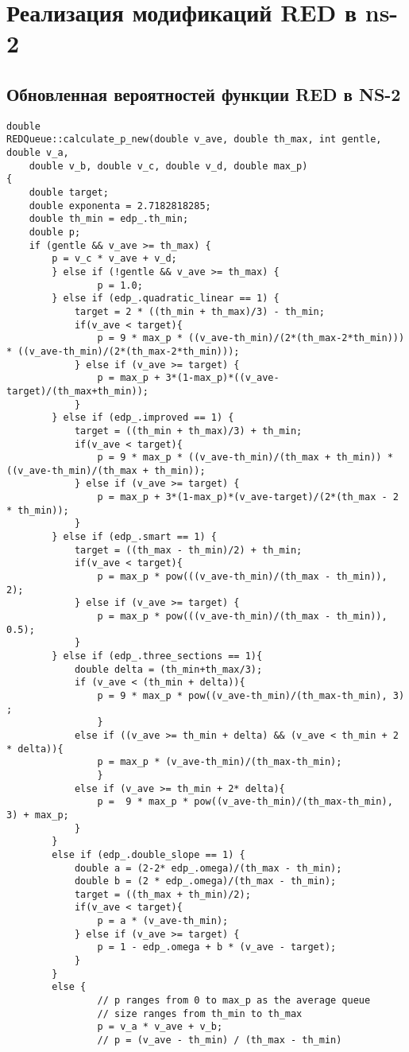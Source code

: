
\chapter{Реализация модификаций RED в ns-2}
\label{app2}

\section{Обновленная вероятностей функции RED в NS-2}
\label{app2:sec1}
\begin{verbatim}
double
REDQueue::calculate_p_new(double v_ave, double th_max, int gentle, double v_a, 
	double v_b, double v_c, double v_d, double max_p)
{	
	double target;
	double exponenta = 2.7182818285;
	double th_min = edp_.th_min;
	double p;
	if (gentle && v_ave >= th_max) {
		p = v_c * v_ave + v_d;
        } else if (!gentle && v_ave >= th_max) { 
                p = 1.0;
        } else if (edp_.quadratic_linear == 1) {
        	target = 2 * ((th_min + th_max)/3) - th_min;
        	if(v_ave < target){
        		p = 9 * max_p * ((v_ave-th_min)/(2*(th_max-2*th_min))) * ((v_ave-th_min)/(2*(th_max-2*th_min)));
        	} else if (v_ave >= target) {
        		p = max_p + 3*(1-max_p)*((v_ave-target)/(th_max+th_min));
        	}
        } else if (edp_.improved == 1) {
        	target = ((th_min + th_max)/3) + th_min;
        	if(v_ave < target){
        		p = 9 * max_p * ((v_ave-th_min)/(th_max + th_min)) * ((v_ave-th_min)/(th_max + th_min));
        	} else if (v_ave >= target) {
        		p = max_p + 3*(1-max_p)*(v_ave-target)/(2*(th_max - 2 * th_min));
        	}
        } else if (edp_.smart == 1) {
        	target = ((th_max - th_min)/2) + th_min;
        	if(v_ave < target){
        		p = max_p * pow(((v_ave-th_min)/(th_max - th_min)), 2);
        	} else if (v_ave >= target) {
        		p = max_p * pow(((v_ave-th_min)/(th_max - th_min)), 0.5);
        	}
        } else if (edp_.three_sections == 1){
        	double delta = (th_min+th_max/3);
        	if (v_ave < (th_min + delta)){
        		p = 9 * max_p * pow((v_ave-th_min)/(th_max-th_min), 3) ;
        		}
        	else if ((v_ave >= th_min + delta) && (v_ave < th_min + 2 * delta)){
        		p = max_p * (v_ave-th_min)/(th_max-th_min);
        		}
        	else if (v_ave >= th_min + 2* delta){
        		p =  9 * max_p * pow((v_ave-th_min)/(th_max-th_min), 3) + max_p;
        	} 
        }
        else if (edp_.double_slope == 1) {
        	double a = (2-2* edp_.omega)/(th_max - th_min);
        	double b = (2 * edp_.omega)/(th_max - th_min);
        	target = ((th_max + th_min)/2);
        	if(v_ave < target){
        		p = a * (v_ave-th_min);
        	} else if (v_ave >= target) {
        		p = 1 - edp_.omega + b * (v_ave - target);
        	}
        }
        else {
                // p ranges from 0 to max_p as the average queue
                // size ranges from th_min to th_max 
                p = v_a * v_ave + v_b;
                // p = (v_ave - th_min) / (th_max - th_min)
                

\end{verbatim}
